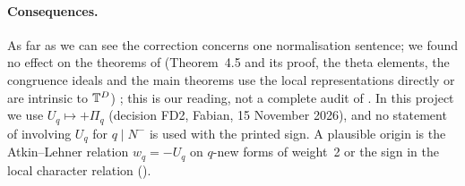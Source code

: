 \paragraph{Consequences.} As far as we can see the correction concerns one normalisation sentence; we found no effect on the
theorems of \cite{Hs} (Theorem~4.5 and its proof, the theta elements, the congruence ideals and the main theorems use the
local representations directly or are intrinsic to $\mathbb{T}^D$) \cite[\S4]{LLhsieh}; this is our reading, not a complete audit of
\cite{Hs}. In this project we use $U_q\mapsto+\Pi_q$ (decision FD2, Fabian, 15 November 2026), and no statement of \cite{Hs}
involving $U_q$ for $q\mid N^-$ is used with the printed sign. A plausible origin is the Atkin--Lehner relation $w_q=-U_q$ on
$q$-new forms of weight~2 or the sign in the local character relation (\stconj).
